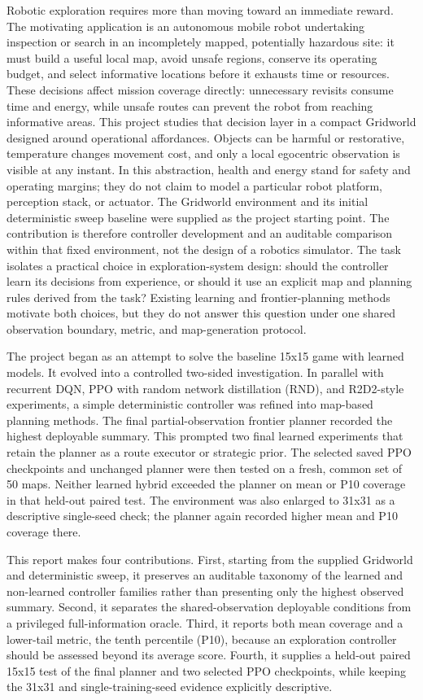 \documentclass[10pt,letterpaper]{article}
\begin{document}
Robotic exploration requires more than moving toward an immediate reward. The motivating application is an autonomous mobile robot undertaking inspection or search in an incompletely mapped, potentially hazardous site: it must build a useful local map, avoid unsafe regions, conserve its operating budget, and select informative locations before it exhausts time or resources. These decisions affect mission coverage directly: unnecessary revisits consume time and energy, while unsafe routes can prevent the robot from reaching informative areas. This project studies that decision layer in a compact Gridworld designed around operational affordances. Objects can be harmful or restorative, temperature changes movement cost, and only a local egocentric observation is visible at any instant. In this abstraction, health and energy stand for safety and operating margins; they do not claim to model a particular robot platform, perception stack, or actuator. The Gridworld environment and its initial deterministic sweep baseline were supplied as the project starting point. The contribution is therefore controller development and an auditable comparison within that fixed environment, not the design of a robotics simulator. The task isolates a practical choice in exploration-system design: should the controller learn its decisions from experience, or should it use an explicit map and planning rules derived from the task? Existing learning and frontier-planning methods motivate both choices, but they do not answer this question under one shared observation boundary, metric, and map-generation protocol.

The project began as an attempt to solve the baseline 15x15 game with learned models. It evolved into a controlled two-sided investigation. In parallel with recurrent DQN, PPO with random network distillation (RND), and R2D2-style experiments, a simple deterministic controller was refined into map-based planning methods. The final partial-observation frontier planner recorded the highest deployable summary. This prompted two final learned experiments that retain the planner as a route executor or strategic prior. The selected saved PPO checkpoints and unchanged planner were then tested on a fresh, common set of 50 maps. Neither learned hybrid exceeded the planner on mean or P10 coverage in that held-out paired test. The environment was also enlarged to 31x31 as a descriptive single-seed check; the planner again recorded higher mean and P10 coverage there.

This report makes four contributions. First, starting from the supplied Gridworld and deterministic sweep, it preserves an auditable taxonomy of the learned and non-learned controller families rather than presenting only the highest observed summary. Second, it separates the shared-observation deployable conditions from a privileged full-information oracle. Third, it reports both mean coverage and a lower-tail metric, the tenth percentile (P10), because an exploration controller should be assessed beyond its average score. Fourth, it supplies a held-out paired 15x15 test of the final planner and two selected PPO checkpoints, while keeping the 31x31 and single-training-seed evidence explicitly descriptive.
\end{document}
